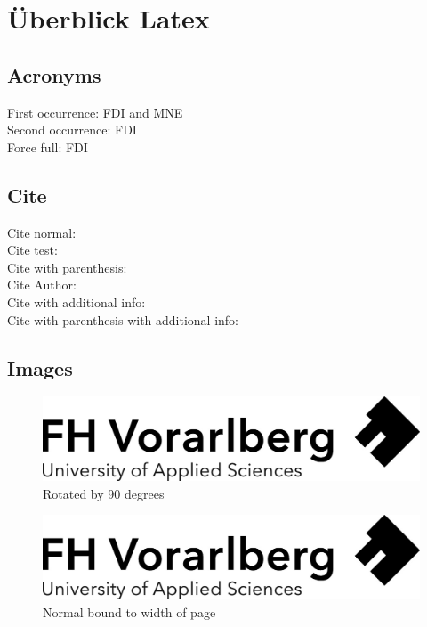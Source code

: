 \chapter{Überblick Latex}\label{ch:overview-latex}
\section{Acronyms}
    First occurrence: \ac{FDI} and \ac{MNE}\\
    Second occurrence: \ac{FDI}\\
    Force full: \acf{FDI}
\section{Cite}
    Cite normal: \cite{HRCS} \\
    Cite test: \cite{george_arnett_foreign_2015} \\
    Cite with parenthesis: \citep{george_arnett_foreign_2014} \\
    Cite Author: \citeauthor{george_arnett_foreign_2014} \\
    Cite with additional info: \citet[Page 2, Fig. I.1]{george_arnett_foreign_2014} \\
    Cite with parenthesis with additional info: \citep[Page 2, Fig. I.1]{george_arnett_foreign_2014}

\section{Images}
\begin{figure}[H] 
  \centering
    \includegraphics[angle=90]{_other/titlepage/Logo-A3.jpg}%
  \caption{Rotated by 90 degrees}
  \label{fig:rotatedImg}
\end{figure}
\begin{figure}[H] 
  \centering
    \includegraphics[width=1\textwidth,angle=0,scale=1]{_other/titlepage/Logo-A3.jpg}%
  \caption{Normal bound to width of page}
  \label{fig:em202y}
\end{figure}
    
